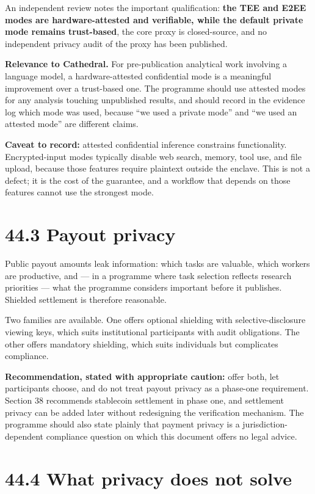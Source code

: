 \documentclass[
  11pt]{report}
\begin{document}
An independent review notes the important qualification: \textbf{the TEE
and E2EE modes are hardware-attested and verifiable, while the default
private mode remains trust-based}, the core proxy is closed-source, and
no independent privacy audit of the proxy has been published.

\textbf{Relevance to Cathedral.} For pre-publication analytical work
involving a language model, a hardware-attested confidential mode is a
meaningful improvement over a trust-based one. The programme should use
attested modes for any analysis touching unpublished results, and should
record in the evidence log which mode was used, because ``we used a
private mode'' and ``we used an attested mode'' are different claims.

\textbf{Caveat to record:} attested confidential inference constrains
functionality. Encrypted-input modes typically disable web search,
memory, tool use, and file upload, because those features require
plaintext outside the enclave. This is not a defect; it is the cost of
the guarantee, and a workflow that depends on those features cannot use
the strongest mode.

\hypertarget{payout-privacy}{%
\section{44.3 Payout privacy}\label{payout-privacy}}

Public payout amounts leak information: which tasks are valuable, which
workers are productive, and --- in a programme where task selection
reflects research priorities --- what the programme considers important
before it publishes. Shielded settlement is therefore reasonable.

Two families are available. One offers optional shielding with
selective-disclosure viewing keys, which suits institutional
participants with audit obligations. The other offers mandatory
shielding, which suits individuals but complicates compliance.

\textbf{Recommendation, stated with appropriate caution:} offer both,
let participants choose, and do not treat payout privacy as a phase-one
requirement. Section 38 recommends stablecoin settlement in phase one,
and settlement privacy can be added later without redesigning the
verification mechanism. The programme should also state plainly that
payment privacy is a jurisdiction-dependent compliance question on which
this document offers no legal advice.

\hypertarget{what-privacy-does-not-solve}{%
\section{44.4 What privacy does not
solve}\label{what-privacy-does-not-solve}}
\end{document}
